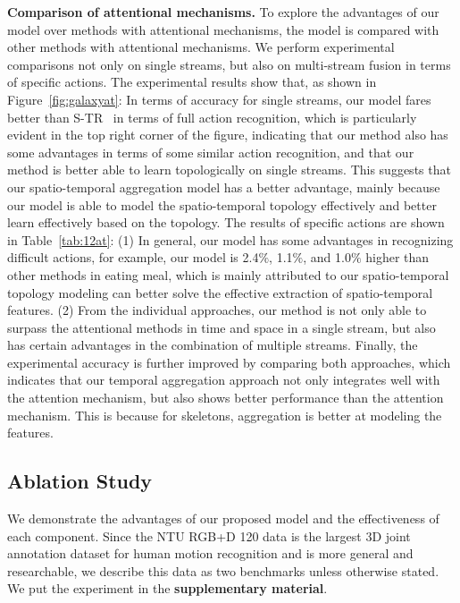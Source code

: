 \documentclass[letterpaper]{article} \usepackage[submission]{aaai23}  \usepackage{times}  \usepackage{helvet}  \usepackage{courier}  \usepackage[hyphens]{url}  \usepackage{graphicx} \urlstyle{rm} \def\UrlFont{\rm}  \usepackage{natbib}  \usepackage{caption} \frenchspacing  \setlength{\pdfpagewidth}{8.5in} \setlength{\pdfpageheight}{11in} \usepackage{algorithm}
\begin{document}
\noindent
{\bf Comparison of attentional mechanisms.} To explore the advantages of our model over methods with attentional mechanisms, the model is compared with other methods with attentional mechanisms. We perform experimental comparisons not only on single streams, but also on multi-stream fusion in terms of specific actions. The experimental results show that, as shown in Figure~\ref{fig:galaxyat}: In terms of accuracy for single streams, our model fares better than S-TR~\cite{2020sttr} in terms of full action recognition, which is particularly evident in the top right corner of the figure, indicating that our method also has some advantages in terms of some similar action recognition, and that our method is better able to learn topologically on single streams. This suggests that our spatio-temporal aggregation model has a better advantage, mainly because our model is able to model the spatio-temporal topology effectively and better learn effectively based on the topology. The results of specific actions are shown in Table~\ref{tab:12at}: (1) In general, our model has some advantages in recognizing difficult actions, for example, our model is 2.4$\%$, 1.1$\%$, and 1.0$\%$ higher than other methods in eating meal, which is mainly attributed to our spatio-temporal topology modeling can better solve the effective extraction of spatio-temporal features. (2) From the individual approaches, our method is not only able to surpass the attentional methods in time and space in a single stream, but also has certain advantages in the combination of multiple streams. Finally, the experimental accuracy is further improved by comparing both approaches, which indicates that our temporal aggregation approach not only integrates well with the attention mechanism, but also shows better performance than the attention mechanism. This is because for skeletons, aggregation is better at modeling the features. 
\subsection{Ablation Study}
\label{sec:DA}

We demonstrate the advantages of our proposed model and the effectiveness of each component. Since the NTU RGB+D 120 data is the largest 3D joint annotation dataset for human motion recognition and is more general and researchable, we describe this data as two benchmarks unless otherwise stated. We put the experiment in the {\bf supplementary material}.
\end{document}
